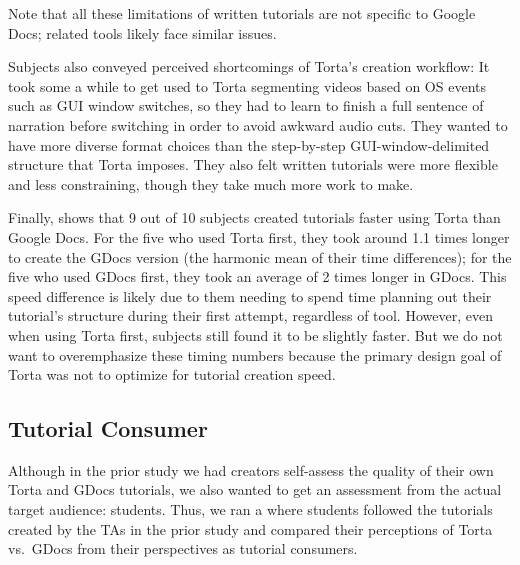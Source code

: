 Note that all these limitations of written tutorials are not specific to
Google Docs; related tools likely face similar issues.


Subjects also conveyed perceived shortcomings of Torta's creation
workflow: It took some a while to get used to Torta segmenting videos
based on OS events such as GUI window switches, so they had to learn to
finish a full sentence of narration before switching in order to avoid
awkward audio cuts. They wanted to have more diverse format choices
than the step-by-step GUI-window-delimited structure that Torta imposes.
They also felt written tutorials were more flexible and less constraining,
though they take much more work to make.

Finally,  shows that 9 out of 10 subjects created tutorials faster using Torta than
Google Docs.
For the five who used Torta first, they took around 1.1 times longer to
create the GDocs version (the harmonic mean of their time differences);
for the five who used GDocs first, they took an average of 2 times
longer in GDocs. This speed difference is likely due to them needing to spend
time planning out their tutorial's structure during their first attempt,
regardless of tool.  However, even when using
Torta first, subjects still
found it to be slightly faster. But we do not want to overemphasize these
timing numbers because the primary design goal of Torta was not to optimize
for tutorial creation speed.


\subsection{Tutorial Consumer }

Although in the prior study we had creators self-assess the quality of their own Torta and
GDocs tutorials, we also wanted to get an assessment from the actual
target audience: students. Thus, we ran a  where students
followed the tutorials created by the TAs in the prior study and
compared their perceptions of Torta vs.\ GDocs from their perspectives
as tutorial consumers.


